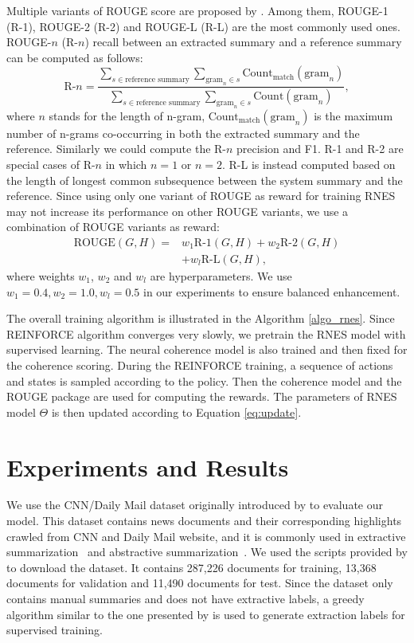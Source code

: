 \documentclass[letterpaper]{article} \usepackage{aaai18}  \usepackage{times}  \usepackage{helvet}  \usepackage{courier}  \usepackage{url}  \usepackage{graphicx}  \usepackage{amssymb}
\begin{document}
	Multiple variants of ROUGE score are proposed by \cite{rouge}. Among them, ROUGE-1 (R-1), ROUGE-2 (R-2) and ROUGE-L (R-L) are the most commonly used ones. ROUGE-$n$ (R-$n$) recall between an extracted summary and a reference summary can be computed as follows:
	\[ \text{R-}n = \frac{\sum_{s\in\text{reference summary}} \sum_{\text{gram}_n \in s} \text{Count}_{\text{match}} (\text{gram}_n) }{\sum_{s\in\text{reference summary}} \sum_{\text{gram}_n \in s} \text{Count} (\text{gram}_n)} , \]
	where $n$ stands for the length of n-gram, $\text{Count}_{\text{match}} (\text{gram}_n)$ is the maximum number of n-grams co-occurring in both the extracted summary and the reference. Similarly we could compute the R-$n$ precision and F1. R-1 and R-2 are special cases of R-$n$ in which $n=1$ or $n=2$. R-L is instead computed based on the length of longest common subsequence between the system summary and the reference. Since using only one variant of ROUGE as reward for training RNES may not increase its performance on other ROUGE variants, we use a combination of ROUGE variants as reward:
	\begin{align*}
	\text{ROUGE}(G, H) = & w_1 \text{R-1}(G, H) + w_2 \text{R-2}(G, H) \\
	& + w_l \text{R-L}(G, H),
	\end{align*}
	where weights $w_1$, $w_2$ and $w_l$ are hyperparameters. We use $w_1=0.4, w_2=1.0, w_l=0.5$ in our experiments to ensure balanced enhancement.

	The overall training algorithm is illustrated in the Algorithm \ref{algo_rnes}. Since REINFORCE algorithm converges very slowly, we pretrain the RNES model with supervised learning. The neural coherence model is also trained and then fixed for the coherence scoring. During the REINFORCE training, a sequence of actions and states is sampled according to the policy. Then the coherence model and the ROUGE package are used for computing the rewards. The parameters of RNES model $\Theta$ is then updated according to Equation \ref{eq:update}. 
	
	
	\section{Experiments and Results}

	We use the CNN/Daily Mail dataset originally introduced by \cite{hermann_teaching_2015} to evaluate our model. This dataset contains news documents and their corresponding highlights crawled from CNN and Daily Mail website, and it is commonly used in extractive summarization~\cite{jianpeng2016,SummaRuNNer} and abstractive summarization~\cite{nallapati_ramesh_abstractive_2016,see_get_2017}. We used the scripts provided by \cite{hermann_teaching_2015} to download the dataset. It contains 287,226 documents for training, 13,368 documents for validation and 11,490 documents for test. Since the dataset only contains manual summaries and does not have extractive labels, a greedy algorithm similar to the one presented by \cite{SummaRuNNer} is used to generate extraction labels for supervised training.
\end{document}
